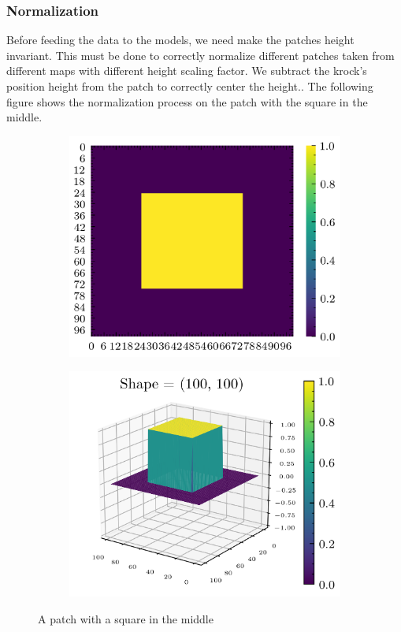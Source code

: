 \documentclass[../document.tex]{subfiles}
\begin{document}
\subsubsection{Normalization}
Before feeding the data to the models, we need make the patches height invariant. This must be done to correctly normalize different patches taken from different maps with different height scaling factor. We subtract the krock's position height from the patch to correctly center the height.. The following figure shows the normalization process on the patch with the square in the middle.
\begin{figure}[H]
        \begin{subfigure}[b]{0.5\textwidth}
            \includegraphics[width=\textwidth]{../img/data-aug/2d/square-middle.png}
        \end{subfigure}
        \begin{subfigure}[b]{0.5\textwidth}
            \includegraphics[width=\textwidth]{../img/data-aug/square-middle.png}
        \end{subfigure}    
    \label{fig: square-patch}
    \caption{A patch with a square in the middle}    
\end{figure}
\end{document}
